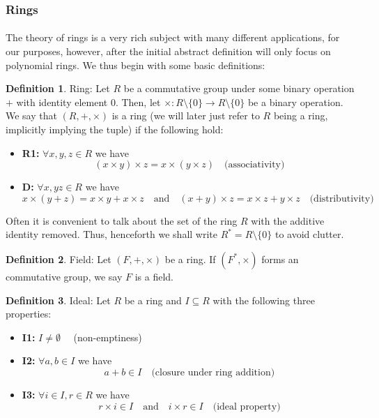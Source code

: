 \documentclass{article}
\theoremstyle{definition}
\newtheorem{definition}{Definition}[section]
\theoremstyle{example}
\begin{document}
\subsubsection{Rings}
\paragraph{} The theory of rings is a very rich subject with many different
applications, for our purposes, however, after the initial abstract definition
will only focus on polynomial rings. We thus begin with some basic definitions:
\begin{definition}{Ring:}
  Let $R$ be a commutative group under some binary operation $+$ with identity
  element $0$. Then, let $\times: R \setminus \{0\} \to R \setminus \{0\}$ be a
  binary operation. We say that $(R, +, \times)$ is a ring (we will later just
  refer to $R$ being a ring, implicitly implying the tuple) if the following
  hold:
  \begin{itemize}
  \item \textbf{R1:} $\forall x, y, z \in R$ we have 
    \[
      (x \times y) \times z = x \times (y \times z)\quad  \text{(associativity)}
    \]  
  \item \textbf{D:} $\forall x, y z \in R$ we have 
    \[
      x \times (y + z) = x \times y + x \times z \quad\text{and}\quad (x + y) \times z = x \times z + y \times z \quad\text{(distributivity)}
    \] 
 \end{itemize}
\end{definition}
Often it is convenient to talk about the set of the ring $R$ with the additive
identity removed. Thus, henceforth we shall write $R^* = R \setminus \{0\}$ to
avoid clutter.
\begin{definition}{Field:}
  Let $(F, +, \times)$ be a ring. If $(F^*, \times)$ forms an
  commutative group, we say $F$ is a field.
\end{definition}
\begin{definition}{Ideal:}
  Let $R$ be a ring and $I \subseteq R$ with the following three properties:
  \begin{itemize}
  \item \textbf{I1:} $I \neq \emptyset\quad$ (non-emptiness) 
  \item \textbf{I2:} $\forall a, b \in I$ we have
      \[
        a + b \in I\quad\text{(closure under ring addition)}
      \]
    \item \textbf{I3:} $\forall i \in I, r \in R$ we have
      \[
        r \times i \in I\quad\text{and}\quad i \times r \in I\quad\text{(ideal property)}
      \]
  \end{itemize}
\end{definition}
\end{document}
